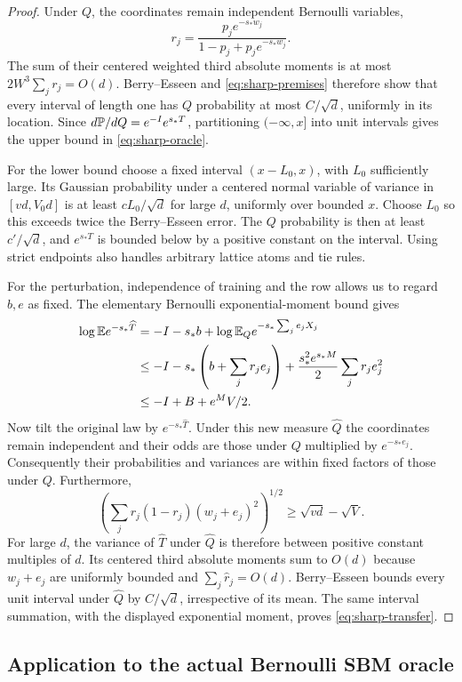 \begin{proof}
Under $Q$, the coordinates remain independent Bernoulli variables,
\[
 r_j=\frac{p_je^{-s_*w_j}}{1-p_j+p_je^{-s_*w_j}}.
\]
The sum of their centered weighted third absolute moments is at most
$2W^3\sum_jr_j=O(d)$. Berry--Esseen and
\eqref{eq:sharp-premises} therefore show that every interval of length one
has $Q$ probability at most $C/\sqrt d$, uniformly in its location. Since
$d\mathbb P/dQ=e^{-I}e^{s_*T}$, partitioning $(-\infty,x]$ into unit intervals
gives the upper bound in \eqref{eq:sharp-oracle}.

For the lower bound choose a fixed interval $(x-L_0,x)$, with $L_0$
sufficiently large. Its Gaussian probability under a centered normal
variable of variance in $[vd,V_0d]$ is at least $cL_0/\sqrt d$ for large
$d$, uniformly over bounded $x$. Choose $L_0$ so this exceeds twice the
Berry--Esseen error. The $Q$ probability is then at least $c'/\sqrt d$,
and $e^{s_*T}$ is bounded below by a positive constant on the interval.
Using strict endpoints also handles arbitrary lattice atoms and tie rules.

For the perturbation, independence of training and the row allows us to
regard $b,e$ as fixed. The elementary Bernoulli exponential-moment bound
gives
\begin{align*}
 \log\mathbb E e^{-s_*\widehat T}
 &= -I-s_*b+\log\mathbb E_Qe^{-s_*\sum_je_jX_j}\\
 &\le -I-s_*\left(b+\sum_jr_je_j\right)
       +\frac{s_*^2e^{s_*M}}2\sum_jr_je_j^2\\
 &\le -I+B+e^M V/2.
\end{align*}
Now tilt the original law by $e^{-s_*\widehat T}$.
Under this new measure $\widehat Q$ the coordinates remain independent and
their odds are those under $Q$ multiplied by $e^{-s_*e_j}$.
Consequently their probabilities and variances are within fixed factors
of those under $Q$. Furthermore,
\[
 \left(\sum_jr_j(1-r_j)(w_j+e_j)^2\right)^{1/2}
 \ge \sqrt{vd}-\sqrt V.
\]
For large $d$, the variance of $\widehat T$ under $\widehat Q$ is therefore
between positive constant multiples of $d$. Its centered third absolute
moments sum to $O(d)$ because $w_j+e_j$ are uniformly bounded and
$\sum_j\widehat r_j=O(d)$. Berry--Esseen bounds every unit interval under
$\widehat Q$ by $C/\sqrt d$, irrespective of its mean. The same interval
summation, with the displayed exponential moment, proves
\eqref{eq:sharp-transfer}.
\end{proof}

\subsection{Application to the actual Bernoulli SBM oracle}

